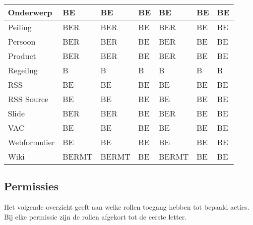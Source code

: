 \begin{tabularx}{\textwidth}{ | p{5cm} |X|X|X|X|X|X| }
  Onderwerp & BE & BE & BE & BE & BE & BE \\ \hline
  Peiling & BER & BER & BE & BER & BE & BE \\ \hline
  Persoon & BER & BER & BE & BER & BE & BE \\ \hline
  Product & BER & BER & BE & BER & BE & BE \\ \hline
  Regeilng & B & B & B & B & B & B \\ \hline
  RSS & BE & BE & BE & BE & BE & BE \\ \hline
  RSS Source & BE & BE & BE & BE & BE & BE \\ \hline
  Slide & BER & BER & BE & BER & BE & BE \\ \hline
  VAC & BE & BE & BE & BE & BE & BE \\ \hline
  Webformulier & BE & BE & BE & BE & BE & BE \\ \hline
  Wiki & BERMT & BERMT & BE & BERMT & BE & BE \\ \hline
\end{tabularx}

\clearpage
\subsection{Permissies}

Het volgende overzicht geeft aan welke rollen toegang hebben tot bepaald acties.
Bij elke permissie zijn de rollen afgekort tot de eerste letter.

